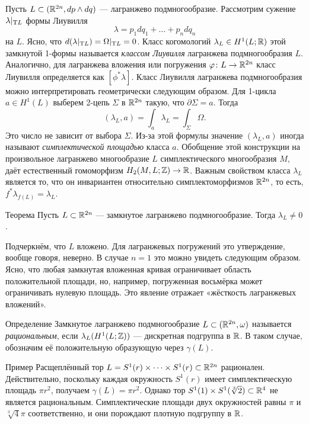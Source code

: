 Пусть $L \subset (\mathbb{R}^{2n}, dp \wedge dq)$ — лагранжево подмногообразие.
Рассмотрим сужение $\lambda|_{\mathrm{T} L}$ формы Лиувилля 
\[\lambda = p_1 dq_1+\dots+ p_n dq_n\]
на $L$.
Ясно, что $d (\lambda|_{\mathrm{T} L}) = \Omega|_{\mathrm{T} L} = 0$.
Класс когомологий $\lambda_L\in H^1(L;\mathbb{R})$ этой замкнутой 1-формы называется \emph{классом Лиувилля} лагранжева подмногообразия $L$.
Аналогично, для лагранжева вложения или погружения $\varphi\colon L \to \mathbb{R}^{2n}$ класс Лиувилля определяется как $[\phi^\ast \lambda]$.
Класс Лиувилля лагранжева подмногообразия можно интерпретировать геометрически следующим образом.
Для 1-цикла $a\in H^1 (L)$ выберем 2-цепь $\Sigma$ в $\mathbb{R}^{2n}$ такую, что $\partial\Sigma = a$.
Тогда
\[(\lambda_L, a) = \int_a\lambda_L = \int_\Sigma\Omega.\]
Это число не зависит от выбора $\Sigma$.
Из-за этой формулы значение $(\lambda_L, a)$ иногда называют \emph{симплектической площадью} класса $a$.
Обобщение этой конструкции на произвольное лагранжево многообразие $L$ симплектического многообразия $M$, даёт естественный гомоморфизм $H_2 (M, L; \mathbb{Z}) \to \mathbb{R}$.
Важным свойством класса $\lambda_L$ является то, что он инвариантен относительно симплектоморфизмов $\mathbb{R}^{2n}$,
то есть,
$f^\ast \lambda_{f (L)} = \lambda_L$.

\begin{thm}[(\cite{G1})]{Теорема}\label{3.2.A}
Пусть $L \subset \mathbb{R}^{2n}$ — замкнутое лагранжево подмногообразие.
Тогда $\lambda_L \ne 0$.
\end{thm}

Подчеркнём, что $L$ вложено.
Для лагранжевых погружений это утверждение, вообще говоря, неверно.
В случае $n = 1$ это можно увидеть следующим образом.
Ясно, что любая замкнутая вложенная кривая ограничивает область положительной площади, но, например, погруженная восьмёрка может ограничивать нулевую площадь.
Это явление отражает «жёсткость лагранжевых вложений».

\begin{ex*}{Определение}
Замкнутое лагранжево подмногообразие $L \z\subset (\RR^{2n}, \omega)$
называется \emph{рациональным}, если $\lambda_L (H^1 (L; \mathbb{Z}))$ —
дискретная подгруппа в $\mathbb{R}$.
В таком случае, обозначим её положительную образующую через $\gamma(L)$.
\end{ex*}

\begin{ex*}{Пример}
Расщеплённый тор $L = S^1 (r) \times\dots\times S^1 (r) \subset
\mathbb{R}^{2n}$ рационален. 
Действительно, поскольку каждая окружность $S^1 (r)$ имеет
симплектическую площадь $\pi r^2$, получаем $\gamma (L) = \pi r^2$. 
Однако тор $S^1(1)\times S^1(\sqrt[3]{2}) \subset \mathbb{R}^4$ не является
рациональным.
Симплектические площади двух окружностей равны $\pi$  и
$\sqrt[3]{4}\pi$ соответственно, и они порождают плотную подгруппу в
$\mathbb{R}$.
\end{ex*}

